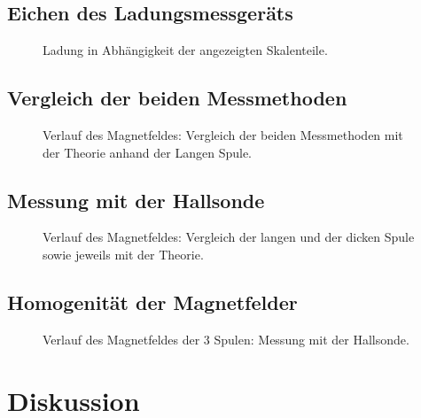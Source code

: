 \documentclass[12pt,a4paper,titlepage,headinclude,bibtotoc]{scrartcl}
\begin{document}
\subsection{Eichen des Ladungsmessgeräts}
\begin{figure}[!htb]
	\centering
	
	\caption{Ladung in Abhängigkeit der angezeigten Skalenteile.}
	\label{fig:Eichen}
\end{figure}

\subsection{Vergleich der beiden Messmethoden}
\begin{figure}[!htb]
	\centering
	
	\caption{Verlauf des Magnetfeldes: Vergleich der beiden Messmethoden mit der Theorie anhand der Langen Spule.}
	\label{fig:LangIndHall}
\end{figure}
\subsection{Messung mit der Hallsonde}
\begin{figure}[!htb]
	\centering
	
	\caption{Verlauf des Magnetfeldes: Vergleich der langen und der dicken Spule sowie jeweils mit der Theorie.}
	\label{fig:HallVergleich}
\end{figure}
\subsection{Homogenität der Magnetfelder}
\begin{figure}[!htb]
	\centering
	
	\caption{Verlauf des Magnetfeldes der 3 Spulen: Messung mit der Hallsonde.}
	\label{fig:Homogen}
\end{figure}


\section{Diskussion}
\label{sec:diskussion}



\end{document}
